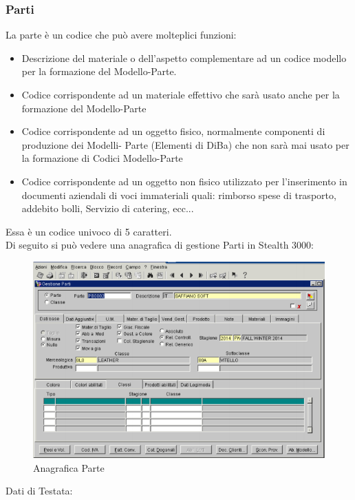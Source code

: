 \subsubsection{Parti}
La parte è un codice che può avere molteplici funzioni:
\begin{itemize}
\item Descrizione del materiale o dell’aspetto complementare ad un codice modello per la formazione del Modello-Parte.

\item Codice corrispondente ad un materiale effettivo che sarà usato anche per la formazione del Modello-Parte

\item Codice corrispondente ad un oggetto fisico, normalmente componenti di produzione dei Modelli- Parte (Elementi di DiBa) che non sarà mai usato per la formazione di Codici Modello-Parte

\item Codice corrispondente ad un oggetto non fisico utilizzato per l’inserimento in documenti aziendali di voci immateriali quali: rimborso spese di trasporto, addebito bolli, Servizio di catering, ecc...
\end{itemize}
Essa è un codice univoco di 5 caratteri.\\
Di seguito si può vedere una anagrafica di gestione Parti in Stealth 3000:

\begin{figure}[!h]
\thispagestyle{empty}
\centering
\includegraphics[scale=0.90]{img/Parte.png}
\caption{Anagrafica Parte}
\end{figure}
\newpage


Dati di Testata:

